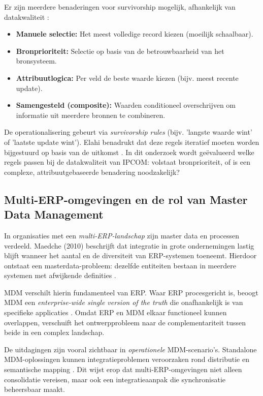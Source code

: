Er zijn meerdere benaderingen voor survivorship mogelijk, afhankelijk van datakwaliteit \autocite{Elahi}:
\begin{itemize}
    \item \textbf{Manuele selectie:} Het meest volledige record kiezen (moeilijk schaalbaar).
    \item \textbf{Bronprioriteit:} Selectie op basis van de betrouwbaarheid van het bronsysteem.
    \item \textbf{Attribuutlogica:} Per veld de beste waarde kiezen (bijv. meest recente update).
    \item \textbf{Samengesteld (composite):} Waarden conditioneel overschrijven om informatie uit meerdere bronnen te combineren.
\end{itemize}

De operationalisering gebeurt via \emph{survivorship rules} (bijv. 'langste waarde wint' of 'laatste update wint'). Elahi benadrukt dat deze regels iteratief moeten worden bijgestuurd op basis van de uitkomst \autocite{Elahi}. In dit onderzoek wordt geëvalueerd welke regels passen bij de datakwaliteit van IPCOM: volstaat bronprioriteit, of is een complexe, attribuutgebaseerde benadering noodzakelijk?

\subsection{Multi-ERP-omgevingen en de rol van Master Data Management}
In organisaties met een \emph{multi-ERP-landschap} zijn master data en processen verdeeld. Maedche (2010) beschrijft dat integratie in grote ondernemingen lastig blijft wanneer het aantal en de diversiteit van ERP-systemen toeneemt. Hierdoor ontstaat een masterdata-probleem: dezelfde entiteiten bestaan in meerdere systemen met afwijkende definities \autocite{Maedche2010}.

MDM verschilt hierin fundamenteel van ERP. Waar ERP procesgericht is, beoogt MDM een \emph{enterprise-wide single version of the truth} die onafhankelijk is van specifieke applicaties \autocite{Maedche2010}. Omdat ERP en MDM elkaar functioneel kunnen overlappen, verschuift het ontwerpprobleem naar de complementariteit tussen beide in een complex landschap.

De uitdagingen zijn vooral zichtbaar in \emph{operationele} MDM-scenario’s. Standalone MDM-oplossingen kunnen integratieproblemen veroorzaken rond distributie en semantische mapping \autocite{Maedche2010}. Dit wijst erop dat multi-ERP-omgevingen niet alleen consolidatie vereisen, maar ook een integratieaanpak die synchronisatie beheersbaar maakt.


